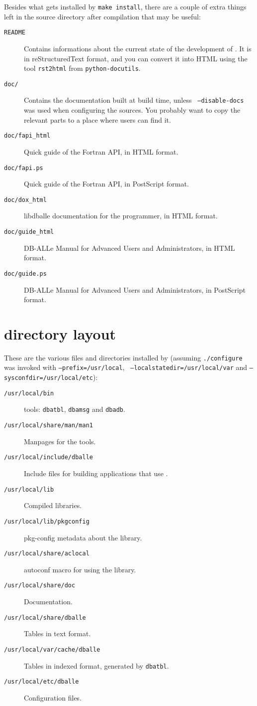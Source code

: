 Besides what gets installed by {\tt make install}, there are a couple of extra
things left in the source directory after compilation that may be useful:

\begin{description}
\item[{\tt README}] Contains informations about the current state of the
	development of \dballe{}.  It is in reStructuredText format, and you
	can convert it into HTML using the tool {\tt rst2html} from
	{\tt python-docutils}.
\item[{\tt doc/}] Contains the documentation built at build time, unless {\tt
	--disable-docs} was used when configuring the sources.  You probably
	want to copy the relevant parts to a place where users can find it.
\item[{\tt doc/fapi\_html}] Quick guide of the Fortran API, in HTML format.
\item[{\tt doc/fapi.ps}] Quick guide of the Fortran API, in PostScript format.
\item[{\tt doc/dox\_html}] libdballe documentation for the programmer, in HTML format.
\item[{\tt doc/guide\_html}] DB-ALLe Manual for Advanced Users and Administrators, in HTML format.
\item[{\tt doc/guide.ps}] DB-ALLe Manual for Advanced Users and Administrators, in PostScript format.
\end{description}


\section {\dballe{} directory layout}
\label{install-dir-layout}

These are the various files and directories installed by \dballe{} (assuming
{\tt ./configure} was invoked with {\tt --prefix=/usr/local}, {\tt
--localstatedir=/usr/local/var} and {\tt --sysconfdir=/usr/local/etc}):

\begin{description}
\item[{\tt /usr/local/bin}]
	\dballe{} tools: {\tt dbatbl}, {\tt dbamsg} and {\tt dbadb}.
\item[{\tt /usr/local/share/man/man1}]
	Manpages for the \dballe{} tools.
\item[{\tt /usr/local/include/dballe}]
	Include files for building applications that use \dballe{}.
\item[{\tt /usr/local/lib}]
	Compiled libraries.
\item[{\tt /usr/local/lib/pkgconfig}]
	pkg-config metadata about the library.
\item[{\tt /usr/local/share/aclocal}]
	autoconf macro for using the library.
\item[{\tt /usr/local/share/doc}]
	Documentation.
\item[{\tt /usr/local/share/dballe}]
	Tables in text format.
\item[{\tt /usr/local/var/cache/dballe}]
	Tables in indexed format, generated by {\tt dbatbl}.
\item[{\tt /usr/local/etc/dballe}]
	Configuration files.
\end{description}
